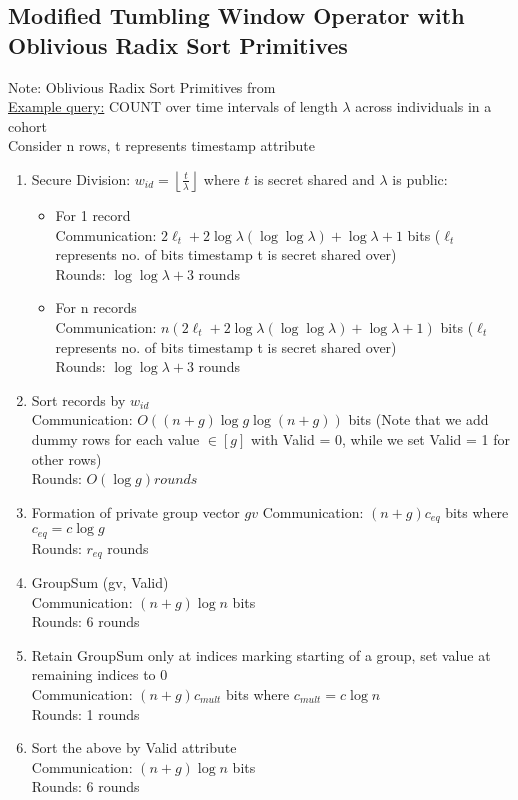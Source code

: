 \documentclass{article}
\begin{document}
\subsection{Modified Tumbling Window Operator with Oblivious Radix Sort Primitives}
Note: Oblivious Radix Sort Primitives from \cite{Ha22} \\
\underline{Example query:} COUNT over time intervals of length $\lambda$ across individuals in a cohort \\
Consider n rows, t represents timestamp attribute 
\begin{enumerate}
\item Secure Division: $w_{id} = \left\lfloor \frac{t}{\lambda} \right\rfloor$ where $t$ is secret shared and $\lambda$ is public:
\begin{itemize}
\item For 1 record \\
Communication: $2\ell_{t} + 2\log \lambda (\log \log \lambda) + \log \lambda + 1$ bits ($\ell_{t}$ represents no. of bits timestamp t is secret shared over) \\
Rounds: $\log \log \lambda + 3$ rounds
\item For n records \\
Communication: $n(2\ell_{t} + 2\log \lambda (\log \log \lambda) + \log \lambda + 1)$ bits ($\ell_{t}$ represents no. of bits timestamp t is secret shared over) \\
Rounds: $\log \log \lambda + 3$ rounds
\end{itemize}
\item Sort records by $w_{id}$ \\
Communication: $O((n+g) \log g \log (n+g))$ bits (Note that we add dummy rows for each value $\in [g]$ with Valid = 0, while we set Valid = 1 for other rows) \\
Rounds: $O(\log g) rounds$
\item Formation of private group vector $gv$
Communication: $(n+g) c_{eq}$ bits where $c_{eq} = c \log g$ \\
Rounds: $r_{eq}$ rounds
\item GroupSum (gv, Valid)  \\
Communication: $(n+g) \log n$ bits \\
Rounds: 6 rounds
\item Retain GroupSum only at indices marking starting of a group, set value at remaining indices to 0 \\
Communication: $(n+g) c_{mult}$ bits where $c_{mult} = c \log n$\\
Rounds: 1 rounds
\item Sort the above by Valid attribute \\
Communication: $(n+g) \log n$ bits \\
Rounds: 6 rounds
\end{enumerate}
\end{document}
